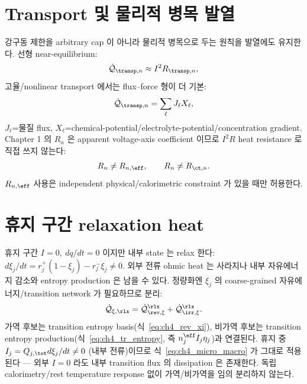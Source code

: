 \section{Transport 및 물리적 병목 발열}\label{sec:ch4_transport}
강구동 제한을 arbitrary cap 이 아니라 물리적 병목으로 두는 원칙을 발열에도 유지한다. 선형 near-equilibrium:
\begin{equation}
\dot{\mathcal Q}_{\transp,n}\approx I^2R_{\transp,n},
\label{eq:ch4_transport_i2r}
\end{equation}
고율/nonlinear transport 에서는 flux--force 형이 더 기본:
\begin{equation}
\dot{\mathcal Q}_{\transp,n}=\sum_\ell J_\ell X_\ell,
\label{eq:ch4_transport_ff}
\end{equation}
$J_\ell$=물질 flux, $X_\ell$=chemical-potential/electrolyte-potential/concentration gradient. Chapter 1 의
$R_n$ 은 apparent voltage-axis coefficient 이므로 $I^2R$ heat resistance 로 직접 쓰지 않는다:
\begin{equation}
R_n\ne R_{n,\eff},\qquad R_n\ne R_{\ct,n}.
\label{eq:ch4_Rsep}
\end{equation}
$R_{n,\eff}$ 사용은 independent physical/calorimetric constraint 가 있을 때만 허용한다.

\section{휴지 구간 relaxation heat}\label{sec:ch4_rest}
휴지 구간 $I=0,\ dq/dt=0$ 이지만 내부 state 는 relax 한다:
$d\xi_j/dt=r_j^+(1-\xi_j)-r_j^-\xi_j\ne0$. 외부 전류 ohmic heat 는 사라지나 내부 자유에너지 감소와 entropy
production 은 남을 수 있다. 정량화엔 $\xi_j$ 의 coarse-grained 자유에너지/transition network 가 필요하므로 분리:
\begin{equation}
\dot{\mathcal Q}_{\xi,\rlx}=\dot{\mathcal Q}_{\rev,\xi}^{\rlx}+\dot{\mathcal Q}_{\irr,\xi}^{\rlx}.
\label{eq:ch4_rest_split}
\end{equation}
가역 후보는 transition entropy basis(식~\eqref{eq:ch4_rev_xi}), 비가역 후보는 transition entropy
production(식~\eqref{eq:ch4_tr_entropy}, 즉 $n_j^{\eff}I_j\eta_j$)과 연결된다. 휴지 중 $I_j=Q_{j,\tot}d\xi_j/dt\ne0$
(내부 전류)이므로 식~\eqref{eq:ch4_micro_macro} 가 그대로 적용된다 — 외부 $I=0$ 라도 내부 transition flux 의
dissipation 은 존재한다. 독립 calorimetry/rest temperature response 없이 가역/비가역을 임의 분리하지 않는다.

